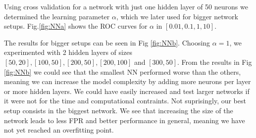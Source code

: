 Using cross validation for a network with just one hidden layer of 50 neurons we determined the learning parameter $\alpha$, which we later used for bigger network setups. Fig.\ref{fig:NNa}  shows the ROC curves for $\alpha$ in  $[0.01,0.1,1,10]$.

The results for bigger setups can be seen in Fig \ref{fig:NNb}. Choosing $\alpha=1$, we experimented with 2 hidden layers of sizes $[50,20],[100,50],[200,50],[200,100]$ and $[300,50]$. From the results in Fig \ref{fig:NNb} we could see that the smallest NN performed worse than the others, meaning we  can increase the model complexity by adding more neurons per layer or more hidden layers.  We could have easily increased and test larger networks if it were not for the time and computational contraints. Not suprisingly, our best setup consists in the biggest network. We see that increasing the size of the network leads to less FPR and better performance in general, meaning we have not yet reached an overfitting point.

